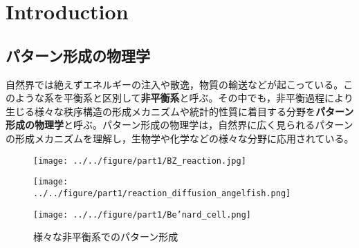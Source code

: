 \documentclass[autodetect-engine,dvi=dvipdfmx,a4paper,ja=standard,oneside,openany,11pt,draft]{bxjsbook}
\begin{document}
\chapter{Introduction}
\section{パターン形成の物理学}
自然界では絶えずエネルギーの注入や散逸，物質の輸送などが起こっている。このような系を平衡系と区別して\textbf{非平衡系}と呼ぶ。その中でも，非平衡過程により生じる様々な秩序構造の形成メカニズムや統計的性質に着目する分野を\textbf{パターン形成の物理学}と呼ぶ。パターン形成の物理学は，自然界に広く見られるパターンの形成メカニズムを理解し，生物学や化学などの様々な分野に応用されている。
\begin{figure}[H]
  \centering
  \begin{minipage}
    {0.32\textwidth}
    \centering
    \texttt{[image: ../../figure/part1/BZ\_reaction.jpg]}
    \label{fig:BZ}
  \end{minipage}
  \begin{minipage}
    {0.32\textwidth}
    \centering
    \texttt{[image: ../../figure/part1/reaction\_diffusion\_angelfish.png]}
    \label{fig:reaction_diffusion_angelfish}
  \end{minipage}
  \begin{minipage}
    {0.32\textwidth}
    \centering
    \texttt{[image: ../../figure/part1/Be’nard\_cell.png]}
    \label{fig:Be’nard_cell}
  \end{minipage}
  \caption{様々な非平衡系でのパターン形成}
  \label{fig:pattern_formation}
\end{figure}
\end{document}
